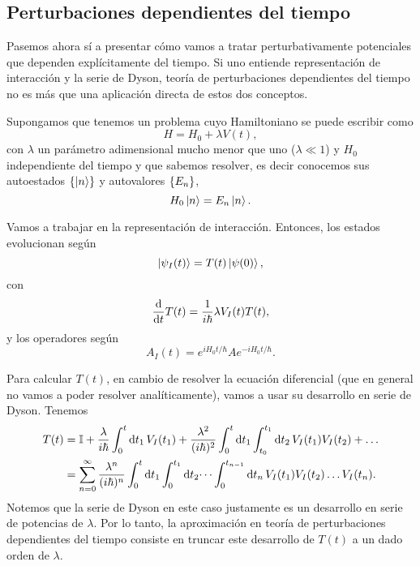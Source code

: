 \documentclass[10pt, a4paper]{article}
\numberwithin{equation}{subsection}
\begin{document}
\subsection{Perturbaciones dependientes del tiempo}
Pasemos ahora sí a presentar cómo vamos a tratar perturbativamente potenciales
que dependen explícitamente del tiempo. Si uno entiende representación de
interacción y la serie de Dyson, teoría de perturbaciones dependientes del
tiempo no es más que una aplicación directa de estos dos conceptos.

Supongamos que tenemos un problema cuyo Hamiltoniano se puede escribir como
\begin{equation}
  H = H_0 + \lambda V(t),
\end{equation}
con $\lambda$ un parámetro adimensional mucho menor que uno ($\lambda \ll 1$) y
$H_0$ independiente del tiempo y que sabemos resolver, es decir conocemos sus
autoestados $\set{\ket{n}}$ y autovalores $\set{E_n}$,
\begin{equation}
  H_0\ket{n} = E_n\ket{n}.
\end{equation}

Vamos a trabajar en la representación de interacción. Entonces, los estados
evolucionan según
\begin{equation}
  \ket{\psi_I(t)} = T(t)\ket{\psi(0)},
\end{equation}
con
\begin{equation}
  \dv{t}T(t) = \frac{1}{i\hbar}\lambda V_I(t) T(t),
\end{equation}
y los operadores según
\begin{equation}
  A_I(t) = e^{iH_0t/\hbar}Ae^{-iH_0t/\hbar}.
\end{equation}

Para calcular $T(t)$, en cambio de resolver la ecuación diferencial (que en
general no vamos a poder resolver analíticamente), vamos a usar su desarrollo
en serie de Dyson. Tenemos
\begin{align}
  T(t)
  &= \mathbb{I} + \frac{\lambda}{i\hbar} \int_{0}^{t}\dd{t_1} V_I(t_1) +
    \frac{\lambda^2}{(i\hbar)^2} \int_{0}^{t}\dd{t_1} \int_{t_0}^{t_1}\dd{t_2}
    V_I(t_1)V_I(t_2) + \dots \\
  &= \sum_{n=0}^{\infty}\frac{\lambda^n}{(i\hbar)^n} \int_{0}^{t}\dd{t_1}
    \int_{0}^{t_1}\dd{t_2} \dots \int_{0}^{t_{n-1}}\dd{t_n}
    V_I(t_1)V_I(t_2) \dots V_I(t_n).
\end{align}
Notemos que la serie de Dyson en este caso justamente es un desarrollo en serie
de potencias de $\lambda$. Por lo tanto, la aproximación en teoría de
perturbaciones dependientes del tiempo consiste en truncar este desarrollo de
$T(t)$ a un dado orden de $\lambda$.
\end{document}
